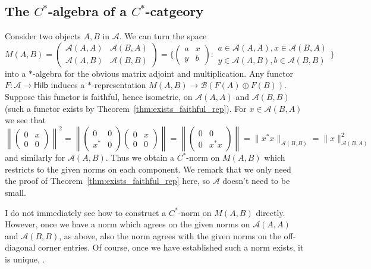 \documentclass[a4paper,11pt]{article}
\theoremstyle{plain}
\theoremstyle{remark}
\newenvironment{remark}
  {\pushQED{\qed}\renewcommand{\qedsymbol}{$\triangle$}\remarkx}
  {\popQED\endremarkx}
\newcommand{\mc}[1]{\mathcal{#1}}
\newcommand{\catHilb}{\textsf{Hilb}}
\begin{document}
\subsection{The \texorpdfstring{$C^*$}{CStar}-algebra of a \texorpdfstring{$C^*$}{CStar}-catgeory}\label{sec:alg_of_cat}

Consider two objects $A,B$ in $\mc A$.  We can turn the space
\[ M(A,B) = \begin{pmatrix} \mc A(A,A) & \mc A(B,A) \\ \mc A(A,B) & \mc A(B,B) \end{pmatrix}
= \Big\{ \begin{pmatrix} a & x \\ y & b \end{pmatrix} : \begin{matrix} a\in\mc A(A,A), x\in\mc A(B,A) \\
  y \in\mc A(A, B), b\in\mc A(B,B) \end{matrix} 
  \Big\} \]  
into a $*$-algebra for the obvious matrix adjoint and multiplication.  Any functor $F\colon\mc A\to\catHilb$ induces a $*$-representation $M(A,B) \to \mc B(F(A)\oplus F(B))$.  Suppose this functor is faithful, hence isometric, on $\mc A(A,A)$ and $\mc A(B,B)$ (such a functor exists by Theorem~\ref{thm:exists_faithful_rep}).  For $x\in\mc A(B,A)$ we see that
\[ \left\| \left(\begin{smallmatrix} 0 & x \\ 0 & 0 \end{smallmatrix}\right) \right\|^2
= \left\| \left(\begin{smallmatrix} 0 & 0 \\ x^* & 0 \end{smallmatrix}\right) \left(\begin{smallmatrix} 0 & x \\ 0 & 0 \end{smallmatrix}\right) \right\|
= \left\| \left(\begin{smallmatrix} 0 & 0 \\ 0 & x^*x \end{smallmatrix}\right) \right\|
= \| x^*x \|_{\mc A(B,B)} = \|x\|_{\mc A(B,A)}^2 \]
and similarly for $\mc A(A,B)$.  Thus we obtain a $C^*$-norm on $M(A,B)$ which restricts to the given norms on each component.  We remark that we only need the proof of Theorem~\ref{thm:exists_faithful_rep} here, so $\mc A$ doesn't need to be small.

\begin{remark}
I do not immediately see how to construct a $C^*$-norm on $M(A,B)$ directly.  However, once we have a norm which agrees on the given norms on $\mc A(A,A)$ and $\mc A(B,B)$, as above, also the norm agrees with the given norms on the off-diagonal corner entries.  Of course, once we have established such a norm exists, it is unique, \cite[Corollary~I.5.4]{TakesakiI}.
\end{remark}
\end{document}
